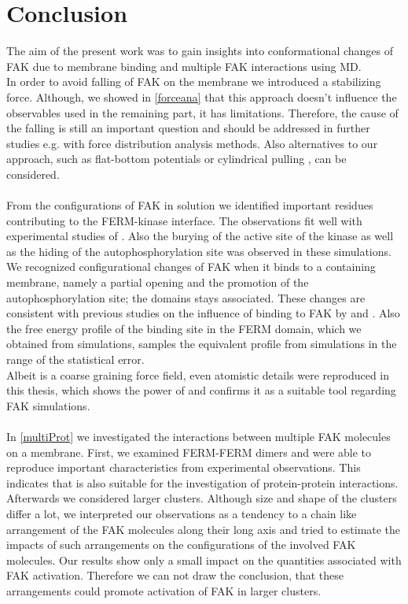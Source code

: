 \chapter{Conclusion}
The aim of the present work was to gain insights into conformational changes of FAK due to membrane binding and multiple FAK interactions using MD.
\\
In order to avoid falling of FAK on the membrane we introduced a stabilizing force. Although, we showed in \autoref{forceana} that this approach doesn't influence the observables used in the remaining part, it has limitations. Therefore, the cause of the falling is still an important question and should be addressed in further studies e.g. with force distribution analysis methods. Also alternatives to our approach, such as flat-bottom potentials or cylindrical pulling \autocite[p. 156-158]{gromacsManual}, can be considered.\\
\\
From the configurations of FAK in solution we identified important residues contributing to the FERM-kinase interface. The observations fit well with experimental studies of \textcite{structFAK}. Also the burying of the active site of the kinase as well as the hiding of the autophosphorylation site was observed in these simulations.\\
We recognized configurational changes of FAK when it binds to a \pip{} containing membrane, namely a partial opening and the promotion of the autophosphorylation site; the domains stays associated. These changes are consistent with previous studies on the influence of \pip{} binding to FAK by \textcite{pap001} and \textcite{pap003}. Also the free energy profile of the \pip{} binding site in the FERM domain, which we obtained from \martini{} simulations, samples the equivalent profile from \charmm{} simulations in the range of the statistical error.\\
Albeit \martini{} is a coarse graining force field, even atomistic details were reproduced in this thesis, which shows the power of \martini{} and confirms it as a suitable tool regarding FAK simulations.\\
\\
In \autoref{multiProt} we investigated the interactions between multiple FAK molecules on a membrane. First, we examined FERM-FERM dimers and were able to reproduce important characteristics from experimental observations. This indicates that \martini{} is also suitable for the investigation of protein-protein interactions. Afterwards we considered larger clusters. Although size and shape of the clusters differ a lot, we interpreted our observations as a tendency to a chain like arrangement of the FAK molecules along their long axis and tried to estimate the impacts of such arrangements on the configurations of the involved FAK molecules. Our results show only a small impact on the quantities associated with FAK activation. Therefore we can not draw the conclusion, that these arrangements could promote activation of FAK in larger clusters.\\
